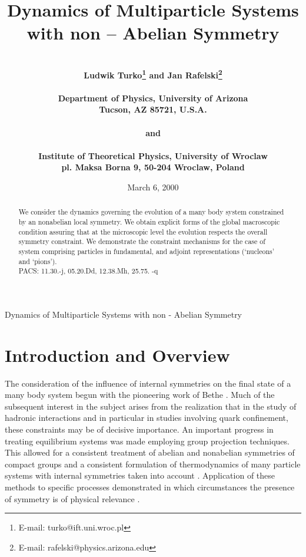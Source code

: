 \documentclass[a4paper,11pt]{article}
\begin{document}
\pagestyle{myheadings}
{Dynamics of Multiparticle Systems with non - Abelian Symmetry}
\title{Dynamics of Multiparticle Systems with non -- Abelian
Symmetry}
\author{
\myHighlight{$\ $}\coordHE{}\\
\bf  Ludwik Turko\footnote{E-mail: turko@ift.uni.wroc.pl}\coordHE{} and
Jan Rafelski\footnote{E-mail: rafelski@physics.arizona.edu}\coordHE{}\\
\myHighlight{$\ $}\coordHE{}\\
\coordHE{}Department of Physics, University of Arizona\\
 Tucson, AZ 85721, U.S.A.\\
\myHighlight{$\ $}\coordHE{}\\ and\\ \myHighlight{$\ $}\coordHE{}\\
\coordHE{}Institute of Theoretical Physics, University of Wroclaw\\
pl. Maksa Borna 9, 50-204 Wroclaw, Poland}
\date{March 6, 2000}   %
\maketitle
\thispagestyle{empty}
\begin{abstract}
{\noindent
We consider the dynamics governing the evolution of
a many body  system constrained by an
nonabelian local  symmetry. We obtain explicit
forms of the global macroscopic
condition assuring that at the  microscopic level  the evolution
 respects the overall symmetry constraint. We demonstrate the
constraint mechanisms for the case of \coordHE{} system comprising
particles in fundamental, and adjoint representations (`nucleons'
and `pions').\\

PACS: 11.30.-j, 05.20.Dd, 12.38.Mh, 25.75. -q
 }
\end{abstract}
\section{\normalsize\bf Introduction and Overview}\label{intr}
\noindent
 The consideration of the influence of internal symmetries on the
final state of a many body system begun with the pioneering work
of Bethe \cite{Bethe}. Much of the subsequent interest in the
subject arises from the realization that in the study of hadronic
interactions and in particular in studies involving quark
confinement, these constraints may be of decisive importance. An
important progress in treating equilibrium systems was made
employing group projection techniques. This allowed for a
consistent treatment of abelian \cite{Magal} and nonabelian
\cite{Cerul,Erics,Zalew,Erik,Skag} symmetries of compact groups
and a consistent formulation of thermodynamics of many particle
systems with internal symmetries taken into account
\cite{TurRed,Turko}. Application of these methods to specific
processes demonstrated in which circumstances the presence of
symmetry is of physical relevance \cite{RafDan,MullRaf,Elze}.
\end{document}
